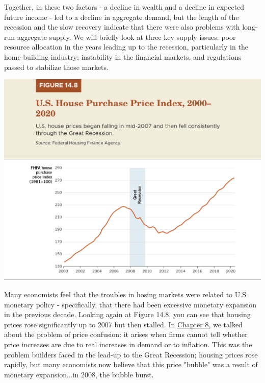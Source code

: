 \documentclass[11pt]{article} %
\begin{document}
Together, in these two factors - a decline in wealth and a decline in expected future income - led to a decline in aggregate demand, but the length of the recession and the slow recovery indicate that there were also problems with long-run aggregate supply. We will briefly look at three key supply issues: poor resource allocation in the years leading up to the recession, particularly in the home-building industry; instability in the financial markets, and regulations passed to stabilize those markets.

\begin{center}
\includegraphics[scale=0.5]{images/Figure 14.8.png} 
\end{center}

Many economists feel that the troubles in hosing markets were related to U.S monetary policy - specifically, that there had been excessive monetary expansion in the previous decade. Looking again at Figure 14.8, you can see that housing prices rose significantly up to 2007 but then stalled. In \underline{Chapter 8}, we talked about the problem of price confusion: it arises when firms cannot tell whether price increases are due to real increases in demand or to inflation. This was the problem builders faced in the lead-up to the Great Recession; housing prices rose rapidly, but many economists now believe that this price "bubble" was a result of monetary expansion...in 2008, the bubble burst.
\end{document}
